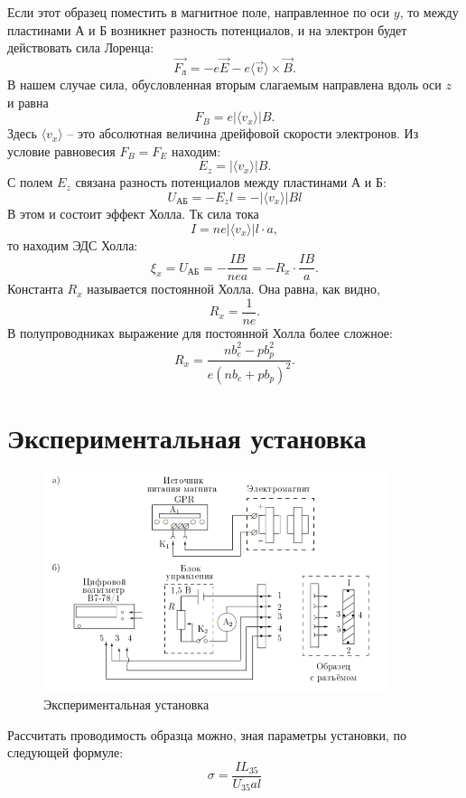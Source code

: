 \documentclass[a4paper, 14pt]{extarticle}%
\newcommand\ECaption[1]{%
     \captionsetup{font=footnotesize}%
     \caption{#1}}
\begin{document}
Если этот образец поместить в магнитное поле, направленное по оси $y$, то между пластинами А и Б возникнет разность потенциалов, и на электрон будет действовать сила Лоренца:
\begin{equation}
\vec{F_{\text{л}}} = -e\vec{E} - e\langle\vec{v}\rangle\times\vec{B}.
\end{equation}
В нашем случае сила, обусловленная вторым слагаемым направлена вдоль оси $z$ и равна
\[F_B = e\vert\langle v_x\rangle\vert B.\]
Здесь $\langle v_x\rangle$ -- это абсолютная величина дрейфовой скорости электронов. Из условие равновесия $F_B = F_E$ находим:
\[E_z = \vert\langle v_x\rangle\vert B.\]
С полем $E_z$ связана разность потенциалов между пластинами А и Б:
\[U_{\text{АБ}} = -E_zl= -\vert\langle v_x\rangle\vert Bl\]
В этом и состоит эффект Холла. Тк сила тока 
\[I = ne\vert\langle v_x\rangle\vert l\cdot a,\]
то находим ЭДС Холла:
\begin{equation}
\xi_x = U_{\text{АБ}} = -\frac{IB}{nea}=-R_x\cdot\frac{IB}{a}.
\end{equation}
Константа $R_x$ называется постоянной Холла. Она равна, как видно,
\begin{equation}
R_x = \frac{1}{ne}.
\end{equation}
В полупроводниках выражение для постоянной Холла более сложное:
\[R_x = \dfrac{nb_e^2 - pb_p^2}{e(nb_e+pb_p)^2}.\]
\section*{Экспериментальная установка}
\begin{figure}[h!]
\begin{center}
\includegraphics[width=0.9\textwidth]{ust}
\end{center}
\ECaption{Экспериментальная установка}
\end{figure}
Рассчитать проводимость образца можно, зная параметры установки, по следующей формуле:
\begin{equation}
\sigma=\dfrac{IL_{35}}{U_{35}al}
\end{equation}
\end{document}
